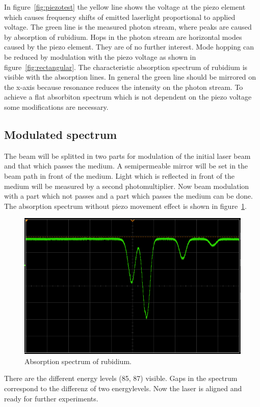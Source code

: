 In figure~\ref{fig:piezotest} the yellow line shows the voltage at the piezo
element which causes frequency shifts of emitted laserlight proportional to
applied voltage.
The green line is the measured photon stream, where peaks are caused by
absorption of rubidium. 
Hops in the photon stream are horizontal modes caused by the piezo element.
They are of no further interest.
Mode hopping can be reduced by modulation with the piezo voltage as shown in 
figure~\ref{fig:rectangular}.
The characteristic absorption spectrum of rubidium is visible with the
absorption lines. 
In general the green line should be mirrored on the x-axis because resonance
reduces the intensity on the photon stream. 
To achieve a flat absorbiton spectrum which is not dependent on the piezo voltage some
modifications are necessary.

\subsection{Modulated spectrum}%
\label{sub:modulated_spectrum}

The beam will be splitted in two parts
for modulation of the initial laser beam and that which passes the medium.
A semipermeable mirror will be set in the beam path in front of the medium. 
Light which is reflected in front of the medium will be measured by a second photomultiplier.
Now beam modulation with a part which not passes and a part which passes the
medium can be done. 
The absorption spectrum without piezo movement effect is shown in figure~\ref{fig:modulation}.
\begin{figure}[h]
		\centering
		\includegraphics[width=0.8\linewidth]{./content/pictures/scope_140.png}
		\caption{Absorption spectrum of rubidium.}%
		\label{fig:modulation}
\end{figure}
There are the different energy levels (85, 87) visible.
Gaps in the spectrum correspond to the differenz of two energylevels.
Now the laser is aligned and ready for further experiments.
